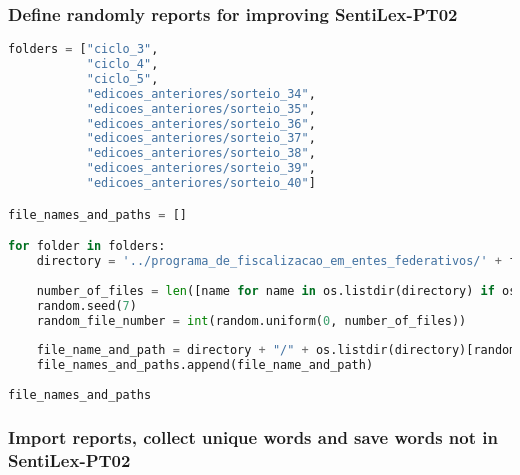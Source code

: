 \hypertarget{define-randomly-reports-for-improving-sentilex-pt02}{%
\subsubsection{Define randomly reports for improving
SentiLex-PT02}\label{define-randomly-reports-for-improving-sentilex-pt02}}

\begin{lstlisting}[language=Python]
folders = ["ciclo_3",
           "ciclo_4",
           "ciclo_5",
           "edicoes_anteriores/sorteio_34",
           "edicoes_anteriores/sorteio_35",
           "edicoes_anteriores/sorteio_36",
           "edicoes_anteriores/sorteio_37",
           "edicoes_anteriores/sorteio_38",
           "edicoes_anteriores/sorteio_39",
           "edicoes_anteriores/sorteio_40"]

file_names_and_paths = []

for folder in folders:
    directory = '../programa_de_fiscalizacao_em_entes_federativos/' + folder
    
    number_of_files = len([name for name in os.listdir(directory) if os.path.isfile(os.path.join(directory, name))]) - 3
    random.seed(7)
    random_file_number = int(random.uniform(0, number_of_files))
    
    file_name_and_path = directory + "/" + os.listdir(directory)[random_file_number]
    file_names_and_paths.append(file_name_and_path)
    
file_names_and_paths
\end{lstlisting}

\hypertarget{import-reports-collect-unique-words-and-save-words-not-in-sentilex-pt02}{%
\subsubsection{Import reports, collect unique words and save words not
in
SentiLex-PT02}\label{import-reports-collect-unique-words-and-save-words-not-in-sentilex-pt02}}

